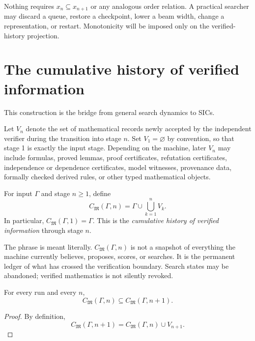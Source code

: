 \begin{caution}
Nothing requires $x_n\subseteq x_{n+1}$ or any analogous order relation. A practical searcher may discard a queue, restore a checkpoint, lower a beam width, change a representation, or restart. Monotonicity will be imposed only on the verified-history projection.
\end{caution}

\section{The cumulative history of verified information}
This construction is the bridge from general search dynamics to SICs.

\begin{definition}
Let $V_n$ denote the set of mathematical records newly accepted by the independent verifier during the transition into stage $n$. Set $V_1=\varnothing$ by convention, so that stage 1 is exactly the input stage. Depending on the machine, later $V_n$ may include formulas, proved lemmas, proof certificates, refutation certificates, independence or dependence certificates, model witnesses, provenance data, formally checked derived rules, or other typed mathematical objects.
\end{definition}

\begin{definition}
For input $\Gamma$ and stage $n\ge 1$, define
\[
C_{\mathfrak M}(\Gamma,n)
=
\Gamma\cup\bigcup_{k=1}^{n}V_k.
\]
In particular, $C_{\mathfrak M}(\Gamma,1)=\Gamma$.
This is the \emph{cumulative history of verified information} through stage $n$.
\end{definition}

The phrase is meant literally. $C_{\mathfrak M}(\Gamma,n)$ is not a snapshot of everything the machine currently believes, proposes, scores, or searches. It is the permanent ledger of what has crossed the verification boundary. Search states may be abandoned; verified mathematics is not silently revoked.

\begin{proposition}
For every run and every $n$,
\[
C_{\mathfrak M}(\Gamma,n)
\subseteq
C_{\mathfrak M}(\Gamma,n+1).
\]
\end{proposition}
\begin{proof}
By definition,
\[
C_{\mathfrak M}(\Gamma,n+1)
=
C_{\mathfrak M}(\Gamma,n)\cup V_{n+1}.
\]
\end{proof}

